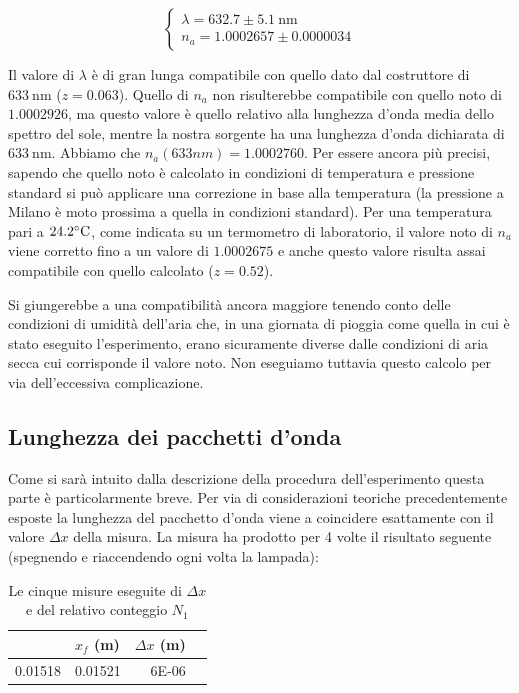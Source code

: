 \documentclass[a4paper,11pt]{article}
\begin{document}
\begin{equation}
\begin{cases}
\lambda = 632.7 \pm 5.1 \ \text{nm} \\ n_a = \num{1.0002657} \pm \num{0.0000034}
\end{cases}
\end{equation}

	Il valore di $\lambda$ è di gran lunga compatibile con quello dato dal costruttore di $633 \ \text{nm}$ ($z = 0.063$). Quello di $n _a$ non risulterebbe compatibile con quello noto di $1.0002926$, ma questo valore è quello relativo alla lunghezza d'onda media dello spettro del sole, mentre la nostra sorgente ha una lunghezza d'onda dichiarata di $\SI{633}{\nano \meter}$. Abbiamo che $n _a (633 nm) = 1.0002760$.
Per essere ancora più precisi, sapendo che quello noto è calcolato in condizioni di temperatura e pressione standard si può applicare una correzione in base alla temperatura (la pressione a Milano è moto prossima a quella in condizioni standard).
Per una temperatura pari a $24.2 \celsius$, come indicata su un termometro di laboratorio, il valore noto di $n _a$ viene corretto fino a un valore di $1.0002675$ e anche questo valore risulta assai compatibile con quello calcolato ($z = 0.52$).

	Si giungerebbe a una compatibilità ancora maggiore tenendo conto delle condizioni di umidità dell'aria che, in una giornata di pioggia come quella in cui è stato eseguito l'esperimento, erano sicuramente diverse dalle condizioni di aria secca cui corrisponde il valore noto. Non eseguiamo tuttavia questo calcolo per via dell'eccessiva complicazione.

\subsection{Lunghezza dei pacchetti d'onda}
Come si sarà intuito dalla descrizione della procedura dell'esperimento questa parte è particolarmente breve. Per via di considerazioni teoriche precedentemente esposte la lunghezza del pacchetto d'onda viene a coincidere esattamente con il valore $\Delta x$ della misura. La misura ha prodotto per 4 volte il risultato seguente (spegnendo e riaccendendo ogni volta la lampada):

\begin{table}[htbp]
	\centering
	\caption{Le cinque misure eseguite di $\Delta x$ e del relativo conteggio $N _1$}
	\begin{tabular}{rrrr}
		\bottomrule
		\rowcolor[rgb]{ .267,  .447,  .769} \multicolumn{1}{l}{\textcolor[rgb]{ 1,  1,  1}{\textbf{$x _i$ (m)}}} & \multicolumn{1}{l}{\textcolor[rgb]{ 1,  1,  1}{\textbf{$x _f$ (m)}}} & \multicolumn{1}{l}{\textcolor[rgb]{ 1,  1,  1}{\textbf{$\Delta x$ (m)}}} \\
		\toprule
		0.01518 & 0.01521 & 6E-06 \\
	\end{tabular}%
\end{table}%
\end{document}
